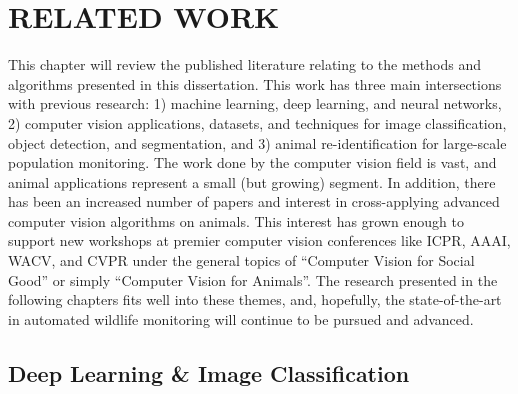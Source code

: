 \chapter{RELATED WORK} \label{chapter:related}

\noindent This chapter will review the published literature relating to the methods and algorithms presented in this dissertation.  This work has three main intersections with previous research: 1) machine learning, deep learning, and neural networks, 2) computer vision applications, datasets, and techniques for image classification, object detection, and segmentation, and 3) animal re-identification for large-scale population monitoring.  The work done by the computer vision field is vast, and animal applications represent a small (but growing) segment. In addition, there has been an increased number of papers and interest in cross-applying advanced computer vision algorithms on animals.  This interest has grown enough to support new workshops at premier computer vision conferences like ICPR, AAAI, WACV, and CVPR under the general topics of ``Computer Vision for Social Good'' or simply ``Computer Vision for Animals''.  The research presented in the following chapters fits well into these themes, and, hopefully, the state-of-the-art in automated wildlife monitoring will continue to be pursued and advanced.

\section{Deep Learning \& Image Classification}

